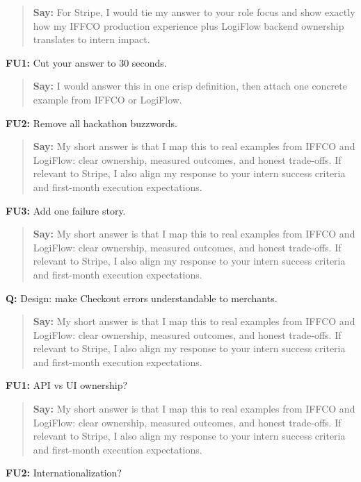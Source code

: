 \documentclass[9pt,a4paper]{article}
\begin{document}
\begin{quote}\small\textbf{Say:} For Stripe, I would tie my answer to your role focus and show exactly how my IFFCO production experience plus LogiFlow backend ownership translates to intern impact.\end{quote}
\vspace{2mm}
\textbf{FU1:} Cut your answer to 30 seconds.

\begin{quote}\small\textbf{Say:} I would answer this in one crisp definition, then attach one concrete example from IFFCO or LogiFlow.\end{quote}
\vspace{2mm}
\textbf{FU2:} Remove all hackathon buzzwords.

\begin{quote}\small\textbf{Say:} My short answer is that I map this to real examples from IFFCO and LogiFlow: clear ownership, measured outcomes, and honest trade-offs. If relevant to Stripe, I also align my response to your intern success criteria and first-month execution expectations.\end{quote}
\vspace{2mm}
\textbf{FU3:} Add one failure story.

\begin{quote}\small\textbf{Say:} My short answer is that I map this to real examples from IFFCO and LogiFlow: clear ownership, measured outcomes, and honest trade-offs. If relevant to Stripe, I also align my response to your intern success criteria and first-month execution expectations.\end{quote}
\vspace{2mm}
\textbf{Q:} Design: make Checkout errors understandable to merchants.

\begin{quote}\small\textbf{Say:} My short answer is that I map this to real examples from IFFCO and LogiFlow: clear ownership, measured outcomes, and honest trade-offs. If relevant to Stripe, I also align my response to your intern success criteria and first-month execution expectations.\end{quote}
\vspace{2mm}
\textbf{FU1:} API vs UI ownership?

\begin{quote}\small\textbf{Say:} My short answer is that I map this to real examples from IFFCO and LogiFlow: clear ownership, measured outcomes, and honest trade-offs. If relevant to Stripe, I also align my response to your intern success criteria and first-month execution expectations.\end{quote}
\vspace{2mm}
\textbf{FU2:} Internationalization?
\end{document}
